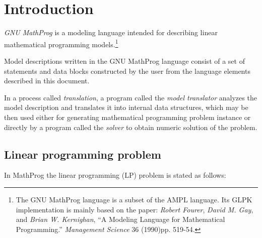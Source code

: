 \documentclass[10pt]{article}
\begin{document}
\newpage

\tableofcontents


\newpage

\section{Introduction}

{\it GNU MathProg} is a modeling language intended for describing
linear mathematical programming models.\footnote{The GNU MathProg
language is a subset of the AMPL language. Its GLPK implementation is
mainly based on the paper: {\it Robert Fourer}, {\it David M. Gay}, and
{\it Brian W. Kernighan}, ``A Modeling Language for Mathematical
Programming.'' {\it Management Science} 36 (1990)\linebreak pp. 519-54.}

Model descriptions written in the GNU MathProg language consist of
a set of statements and data blocks constructed by the user from the
language elements described in this document.

In a process called {\it translation}, a program called the {\it model
translator} analyzes the model description and translates it into
internal data structures, which may be then used either for generating
mathematical programming problem instance or directly by a program
called the {\it solver} to obtain numeric solution of the problem.

\subsection{Linear programming problem}
\label{problem}

In MathProg the linear programming (LP) problem is stated as follows:

\medskip
\end{document}
